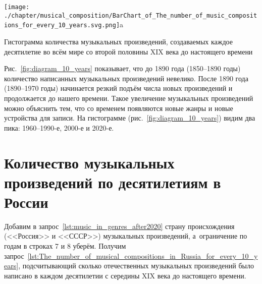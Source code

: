 \newpage
\begin{marginfigure}[-5\baselineskip]
    \texttt{[image: ./chapter/musical\_composition/BarChart\_of\_The\_number\_of\_music\_compositions\_for\_every\_10\_years.svg.png]}a
    \vspace{-7pt}
	\caption{Гистограмма количества музыкальных произведений, 
             создаваемых каждое десятилетие во всём мире со второй половины XIX века до настоящего времени}%
	\label{fig:diagram_10_years}%
\end{marginfigure}
%
Рис.~\ref{fig:diagram_10_years} показывает, что до 1890 года (1850--1890 годы) 
количество написанных музыкальных произведений невелико. 
После 1890 года (1890--1970 годы) начинается резкий подъём числа новых произведений 
и продолжается до нашего времени. 
Такое увеличение музыкальных произведений можно объяснить тем, 
что со временем появляются новые жанры и новые устройства для записи. 
На гистограмме (рис.~\ref{fig:diagram_10_years}) видим два пика: 1960--1990-е, 2000-е и 2020-е.



\section{Количество музыкальных произведений по десятилетиям в России}

Добавим в запрос~\ref{lst:music_in_genres_after2020} страну происхождения (<<Россия>> и <<СССР>>) 
музыкальных произведений, а~ограничение по годам в строках 7 и 8 уберём. 
Получим запрос~\ref{lst:The_number_of_musical_compositions_in_Russia_for_every_10_years}, 
подсчитывающий сколько отечественных музыкальных произведений было написано 
в каждом десятилетии с середины XIX века до настоящего времени.

